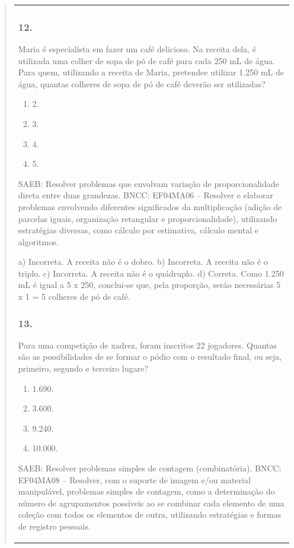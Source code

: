 \begin{mdframed}[linewidth=2pt,linecolor=salmao,roundcorner=2pt]
\begin{itemize}
{\begin{itemize}
\begin{escolha}
{\begin{quote}
{\begin{escolha}
{{{{{\begin{longtable}[]{@{}l@{}}
\begin{itemize}
{\subsubsection{12.}

Maria é especialista em fazer um café delicioso. Na receita dela, é utilizada uma colher de sopa de pó de café para cada 250 mL
de água. Para quem, utilizando a receita de Maria, pretendee utilizar 1.250
mL de água, quantas colheres de sopa de pó de café deverão ser utilizadas?

\begin{enumerate}
\item
  2.
\item
  3.
\item
  4.
\item
  5.
\end{enumerate}

SAEB: Resolver problemas que envolvam variação de
proporcionalidade direta entre duas grandezas.
BNCC: EF04MA06 -- Resolver e elaborar problemas envolvendo diferentes significados da multiplicação
(adição de parcelas iguais, organização retangular e proporcionalidade), utilizando estratégias
diversas, como cálculo por estimativa, cálculo mental e algoritmos.

a) Incorreta. A receita não é o dobro.
b) Incorreta. A receita não é o triplo.
c) Incorreta. A receita não é o quádruplo.
d) Correta. Como 1.250 mL é igual a 5 x 250, conclui-se que, pela proporção, serão necessárias 5 x 1 = 5 colheres de pó de café.

\subsubsection{13.}

Para uma competição de xadrez, foram inscritos 22 jogadores. Quantas são
as possibilidades de se formar o pódio com o resultado final, ou seja,
primeiro, segundo e terceiro lugare?

\begin{enumerate}
\item
  1.690.
\item
  3.600.
\item
  9.240.
\item
  10.000.
\end{enumerate}

SAEB: Resolver problemas simples de contagem (combinatória).
BNCC: EF04MA08 -- Resolver, com o suporte de imagem e/ou material manipulável, problemas simples
de contagem, como a determinação do número de agrupamentos possíveis ao se combinar cada
elemento de uma coleção com todos os elementos de outra, utilizando estratégias e formas de
registro pessoais.

}
\end{itemize}
\end{longtable}}}}}}
\end{escolha}}
\end{quote}}
\end{escolha}
\end{itemize}}
\end{itemize}
\end{mdframed}

